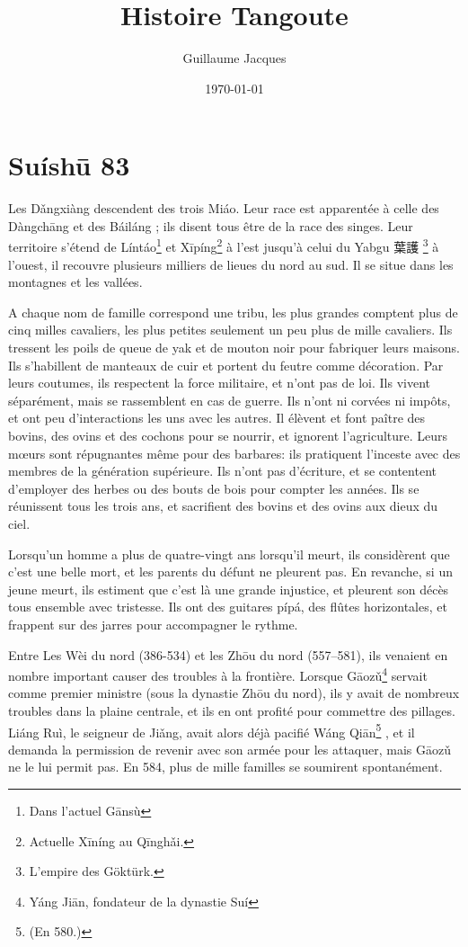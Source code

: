 \documentclass[oldfontcommands,oneside,a4paper,11pt]{memoir}
\title{Histoire Tangoute}
\author{Guillaume Jacques }
\date{\today}
\newcommand{\ipa}[1]{{\phon #1}} %
\newcommand{\ipapl}[1]{{\phondroit #1}}
\newcommand{\zh}[1]{{\cn #1}}
\newcommand{\py}[2]{\ipa{#1} \zh{#2} \index{#1 \zh{#2}}}
\begin{document}
\chapter{Suíshū 83} 

Les  \ipapl{Dǎngxiàng} descendent des trois \ipapl{Miáo}. Leur race est apparentée à celle des \ipapl{Dàngchāng} et des \ipapl{Báiláng} ; ils disent tous être de la race des singes. Leur territoire s'étend de Líntáo\footnote{Dans l'actuel Gānsù} et Xīpíng\footnote{Actuelle Xīníng au Qīnghǎi.} à l'est jusqu'à celui du \py{Yabgu}{葉護}\footnote{L'empire des Göktürk.} à l'ouest, il recouvre plusieurs milliers de lieues du nord au sud. Il se situe dans les montagnes et les vallées. 

A chaque nom de famille correspond une tribu, les plus grandes comptent plus de cinq milles cavaliers, les plus petites seulement un peu plus de mille cavaliers. Ils tressent les poils de queue de yak et de mouton noir pour  fabriquer leurs maisons. Ils s'habillent de manteaux de cuir et portent du feutre comme décoration. Par leurs coutumes, ils respectent la force militaire, et n'ont pas de loi. Ils vivent séparément, mais se rassemblent en cas de guerre. Ils n'ont ni corvées ni impôts, et ont peu d'interactions les uns avec les autres. Il élèvent et font paître des bovins, des ovins et des cochons pour se nourrir, et ignorent l'agriculture. Leurs mœurs sont répugnantes même pour des barbares: ils pratiquent l'inceste avec des membres de la génération supérieure. Ils n'ont pas d'écriture, et se contentent d'employer des herbes ou des bouts de bois pour compter les années. Ils se réunissent tous les trois ans, et sacrifient des bovins et des ovins aux dieux du ciel.

Lorsqu'un homme a plus de quatre-vingt ans lorsqu'il meurt, ils considèrent que c'est une belle mort, et les parents du défunt ne pleurent pas. En revanche, si un jeune meurt, ils estiment que c'est là une grande injustice, et pleurent son décès tous ensemble avec tristesse. Ils ont des guitares pípá, des flûtes horizontales, et frappent sur des jarres pour accompagner le rythme. 

Entre Les Wèi du nord (386-534) et les Zhōu du nord (557–581), ils venaient en nombre important causer des troubles à la frontière. Lorsque Gāozǔ\footnote{Yáng Jiān, fondateur de la dynastie Suí} servait comme premier ministre (sous la dynastie Zhōu du nord),  ils y avait de nombreux troubles dans la plaine centrale, et ils en ont profité pour commettre des pillages. Liáng Ruì, le seigneur de Jiǎng, avait alors déjà pacifié Wáng Qiān\footnote{ (En 580.)} , et il demanda la permission de revenir avec son armée pour les attaquer, mais Gāozǔ ne le lui permit pas. En 584, plus de mille familles se soumirent spontanément. 
\end{document}
